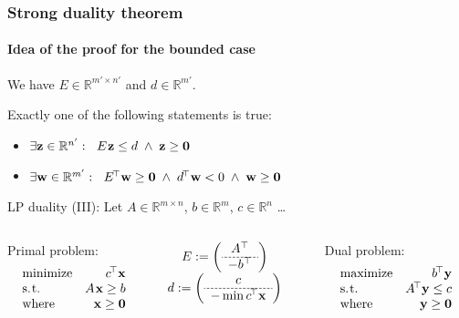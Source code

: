 \documentclass{beamer}
\renewcommand{\.}{\hskip .75pt}
\DeclareMathOperator{\aand}{~\wedge~}
\begin{document}
\begin{frame}
	\frametitle{Strong duality theorem}
	\framesubtitle{Idea of the proof for the bounded case}
	
	We have $E \in \mathbb{R}^{m' \times n'}$ and $d \in \mathbb{R}^{m'}$.
	\smallskip

	Exactly one of the following statements is true:
	\begin{itemize} \color{dblue}
		\item $\exists \bold{z} \in \mathbb{R}^{n'} : \ \; E\. \bold{z} \le d \aand \bold{z} \ge \bold{0}$
		\item $\exists \bold{w} \in \mathbb{R}^{m'} : \ \; E^{\!\top} \bold{w} \ge \bold{0} \aand d^{\!\top} \bold{w} < 0 \aand \bold{w} \ge \bold{0}$
	\end{itemize}
	\bigskip

	LP duality (III): Let $A \in \mathbb{R}^{m \times n}$, $b \in \mathbb{R}^{m}$, $c \in \mathbb{R}^{n}$ \dots
	\bigskip

	\begin{columns}
		\begin{column}{0.31\textwidth}
		Primal problem:
		$$
		\begin{array}{lrcrcl}
			\text{minimize} & c^{\!\top}\bold{x} \\
			\text{s.\.t.} & A\. \bold{x} \ge b \\
			\text{where} & \bold{x} \ge \bold{0}
		\end{array}
		$$
		\end{column}

		\begin{column}{0.34\textwidth} \color{dgreen} \renewcommand{\arraystretch}{1.2}
		$\begin{array}{c}
		E := \left(
		\begin{array}{c}
		A^\top \\ \hdashline[2pt/1pt]
		-b^\top \\
		\end{array}
		\right)
		\\
		d :=\left(
		\begin{array}{c}
		c \\ \hdashline[2pt/1pt]
		- \min c^{\!\top}\bold{x} \\
		\end{array}
		\right)
		\end{array}$
		\end{column}

		\begin{column}{0.35\textwidth}
		Dual problem:
		$$
		\begin{array}{lrcrcl}
			\text{maximize} & b^{\!\top}\bold{y} \\
			\text{s.\.t.} & A^{\!\top} \bold{y} \le c \\
			\text{where} & \bold{y} \ge \bold{0}
		\end{array}
		$$
		\end{column}
	\end{columns}
	
\end{frame}
\end{document}
